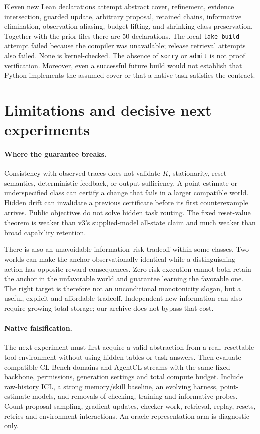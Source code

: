 \documentclass[10pt,twocolumn]{article}
\begin{document}
Eleven new Lean declarations attempt abstract cover, refinement, evidence
intersection, guarded update, arbitrary proposal, retained chains, informative
elimination, observation aliasing, budget lifting, and shrinking-class
preservation. Together with the prior files there are 50 declarations. The local
\texttt{lake build} attempt failed because the compiler was unavailable; release
retrieval attempts also failed. None is kernel-checked. The absence of
\texttt{sorry} or \texttt{admit} is not proof verification. Moreover, even a
successful future build would not establish that Python implements the assumed
cover or that a native task satisfies the contract.

\section{Limitations and decisive next experiments}
\paragraph{Where the guarantee breaks.}
Consistency with observed traces does not validate $K$, stationarity, reset
semantics, deterministic feedback, or output sufficiency. A point estimate or
underspecified class can certify a change that fails in a larger compatible
world. Hidden drift can invalidate a previous certificate before its first
counterexample arrives. Public objectives do not solve hidden task routing.
The fixed reset-value theorem is weaker than v3's supplied-model all-state
claim and much weaker than broad capability retention.

There is also an unavoidable information--risk tradeoff within some classes.
Two worlds can make the anchor observationally identical while a distinguishing
action has opposite reward consequences. Zero-risk execution cannot both retain
the anchor in the unfavorable world and guarantee learning the favorable one.
The right target is therefore not an unconditional monotonicity slogan, but a
useful, explicit and affordable tradeoff. Independent new information can also
require growing total storage; our archive does not bypass that cost.

\balance
\paragraph{Native falsification.}
The next experiment must first acquire a valid abstraction from a real, resettable
tool environment without using hidden tables or task answers. Then evaluate
compatible CL-Bench domains and AgentCL streams with the same fixed backbone,
permissions, generation settings and total compute budget. Include raw-history
ICL, a strong memory/skill baseline, an evolving harness, point-estimate models,
and removals of checking, training and informative probes. Count proposal
sampling, gradient updates, checker work, retrieval, replay, resets, retries and
environment interactions. An oracle-representation arm is diagnostic only.
\end{document}
